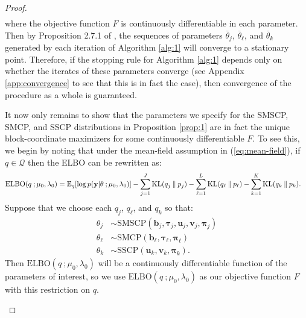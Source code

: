 \begin{proof}
\begin{gather*}
\end{gather*}
where the objective function $F$ is  continuously differentiable in each parameter. Then by Proposition 2.7.1 of \cite{Bertsekas97}, the sequences of parameters $\overline{\theta}_j$, $\overline{\theta}_\ell$, and $\overline{\theta}_k$ generated by each iteration of Algorithm \ref{alg:1} will converge to a stationary point. Therefore, if the stopping rule for Algorithm \ref{alg:1} depends only on whether the iterates of these parameters converge (see Appendix \ref{app:convergence} to see that this is in fact the case), then convergence of the procedure as a whole is guaranteed. 

It now only remains to show that the parameters we specify for the SMSCP, SMCP, and SSCP distributions in Proposition \ref{prop:1} are in fact the unique block-coordinate maximizers for some continuously differentiable $F$. To see this, we begin by noting that under the mean-field assumption in (\ref{eq:mean-field}), if $q \in \mathcal{Q}$ then the ELBO can be rewritten as:
\begin{align}
    \text{ELBO}(q\:;\mu_0,\lambda_0) &= \mathbb{E}_q[\log p(\mathbf{y}| \theta\:; \mu_0,\lambda_0)] - \sum_{j=1}^J \text{KL}(q_j\:\lVert\: p_j) - \sum_{\ell=1}^L \text{KL}(q_\ell\:\lVert\: p_\ell) - \sum_{k=1}^K \text{KL}(q_k\:\lVert\: p_k). \label{eq:elbo-full}
\end{align}
Suppose that we choose each $q_j$, $q_\ell$, and $q_k$ so that:
\begin{align*}
    \theta_j &\sim \text{SMSCP}(\mathbf{b}_j, \pmb{\tau}_j, \mathbf{u}_j, \mathbf{v}_j, \pmb{\pi}_j)\\
    \theta_\ell &\sim \text{SMCP}(\mathbf{b}_\ell, \pmb{\tau}_\ell, \pmb{\pi}_\ell)\\
    \theta_k &\sim \text{SSCP}(\mathbf{u}_k, \mathbf{v}_k, \pmb{\pi}_k). 
\end{align*}
Then $\text{ELBO}(q\:;\mu_0,\lambda_0)$ will be a continuously differentiable function of the parameters of interest, so we use $\text{ELBO}(q\:;\mu_0,\lambda_0)$ as our objective function $F$ with this restriction on $q$.

\begin{enumerate}[label=\roman*.]


\end{enumerate}
\end{proof}
